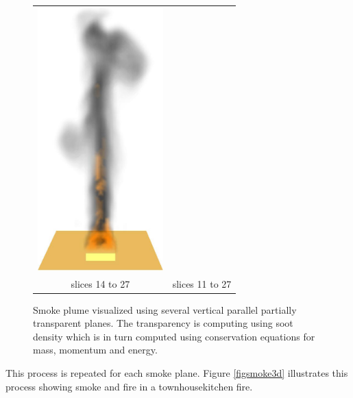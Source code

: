 \documentclass[11pt,twoside]{book}
\begin{document}
\begin{figure}[t]
\begin{center}
\begin{tabular}{cc}
\includegraphics[height=4.0in]{figures/splume_11_27}\\
slices 14 to 27&slices 11 to 27
\end{tabular}
\end{center}
\caption [Smoke plume visualized using several vertical parallel
partially transparent planes.] {Smoke plume visualized using
several vertical parallel partially transparent planes. The
transparency is computing using soot density which is in turn
computed using conservation equations for mass, momentum and
energy. } \label{figplume}
\end{figure}

\noindent This process is repeated for each smoke plane. Figure
\ref{figsmoke3d} illustrates this process showing smoke and fire
in a townhousekitchen fire.
\end{document}
